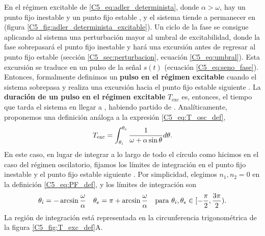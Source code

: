 \documentclass[./main.tex]{subfiles}
\begin{document}
En el régimen excitable de \ref{C5_eq:adler_determinista}, donde $\alpha > \omega$, hay un punto fijo inestable \xxi y un punto fijo estable \xxe, y el sistema tiende a permanecer en \xxe (figura \ref{C5_fig:adler_determinista_excitable}). Un ciclo de la fase \xx se consigue aplicando al sistema una perturbación mayor al umbral de excitabilidad, donde la fase sobrepasará el punto fijo inestable y hará una excursión antes de regresar al punto fijo estable (sección \ref{C5_sec:perturbacion}, ecuación \ref{C5_eq:umbral}). Esta excursión se traduce en un pulso de la señal $s(t)$ (ecuación \ref{C5_eq:seno_fase}). Entonces, formalmente definimos un \textbf{pulso en el régimen excitable} cuando el sistema sobrepasa \xxi y realiza una excursión hacia el punto fijo estable siguiente \xxe. La \textbf{duración de un pulso en el régimen excitable} $T_{\text{exc}}$ es, entonces, el tiempo que tarda el sistema en llegar a \xxe, habiendo partido de \xxi. Analíticamente, proponemos una definición análoga a la expresión \ref{C5_eq:T_osc_def}, 
\begin{align}
    T_{\text{exc}} = \int_{\theta_i}^{\theta_e}  \frac{1}{\omega + \alpha \sin{\ensuremath{\theta}}} d\theta. \label{C5_eq:T_exc_def}
\end{align}
En este caso, en lugar de integrar a lo largo de todo el círculo como hicimos en el caso del régimen oscilatorio, fijamos los límites de integración en el punto fijo inestable \xxi y el punto fijo estable siguiente \xxe. Por simplicidad, elegimos $n_1,n_2 = 0$ en la definición \ref{C5_eq:PF_def}, y los límites de integración son
\begin{equation}
    \theta_i = -\arcsin{\frac{\omega}{\alpha}} \quad \theta_e = \pi + \arcsin{\frac{\omega}{\alpha}} \quad \text{para } \theta_i,\theta_e \in [-\frac{\pi}{2},\frac{3\pi}{2}).
\end{equation}
La región de integración está representada en la circunferencia trigonométrica de la figura \ref{C5_fig:T_exc_def}A. 
\end{document}

